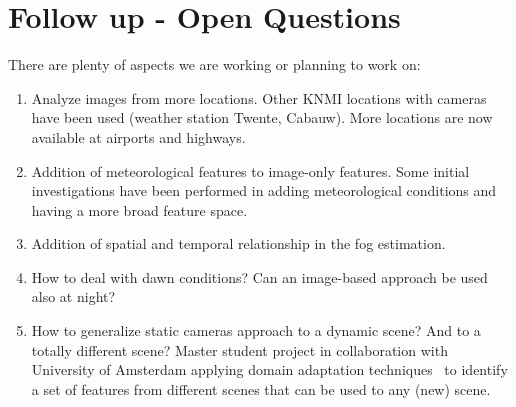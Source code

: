 \documentclass{article}
\begin{document}


\section*{Follow up - Open Questions}
There are plenty of aspects we are working or planning to work on:
\begin{enumerate}
\item Analyze images from more locations. \newline
Other KNMI locations with cameras have been used (weather station Twente, Cabauw). More locations are now available at airports and highways.
\item Addition of meteorological features to image-only features.\newline
Some initial investigations have been performed in adding meteorological conditions and having a more broad feature space.
\item Addition of spatial and temporal relationship in the fog estimation.
\item How to deal with dawn conditions? Can an image-based approach be used also at night?
\item How to generalize static cameras approach to a dynamic scene? And to a totally different scene?\newline
Master student project in collaboration with University of Amsterdam applying domain adaptation techniques~\cite{ganin2016domain} to identify a set of features from different scenes that can be used to any (new) scene.
\end{enumerate}












\ecols %
\end{document}
